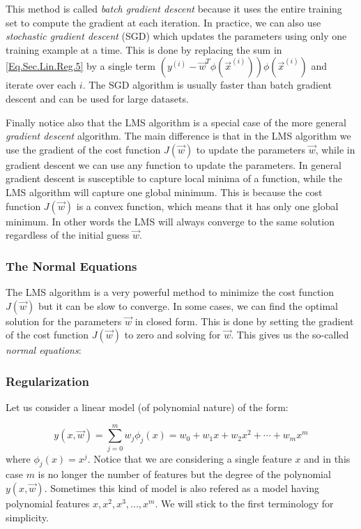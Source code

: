 \begin{remark}
	This method is called \emph{batch gradient descent} because it uses the entire training set to compute the gradient at each iteration. In practice, we can also use \emph{stochastic gradient descent} (SGD) which updates the parameters using only one training example at a time. This is done by replacing the sum in \cref{Eq.Sec.Lin.Reg.5} by a single term $(y^{(i)} - \vec{w}^T\phi(\vec{x}^{(i)}))\phi(\vec{x}^{(i)})$ and iterate over each $i$. The SGD algorithm is usually faster than batch gradient descent and can be used for large datasets. 
\end{remark}

Finally notice also that the LMS algorithm is a special case of the more general \emph{gradient descent} algorithm. The main difference is that in the LMS algorithm we use the gradient of the cost function $J(\vec{w})$ to update the parameters $\vec{w}$, while in gradient descent we can use any function to update the parameters. In general gradient descent is susceptible to capture local minima of a function, while the LMS algorithm will capture one global minimum. This is because the cost function $J(\vec{w})$ is a convex function, which means that it has only one global minimum. In other words the LMS will always converge to the same solution regardless of the initial guess $\vec{w}$. 

\subsubsection{The Normal Equations}
The LMS algorithm is a very powerful method to minimize the cost function $J(\vec{w})$ but it can be slow to converge. In some cases, we can find the optimal solution for the parameters $\vec{w}$ in closed form. This is done by setting the gradient of the cost function $J(\vec{w})$ to zero and solving for $\vec{w}$. This gives us the so-called \emph{normal equations}:


\subsubsection{Regularization}

Let us consider a linear model (of polynomial nature) of the form: 

\begin{equation}\label{Eq.Sec.Lin.Reg.7}
	y(x,\vec{w}) = \sum_{j=0}^{m}w_j\phi_j(x) = w_0 + w_1x + w_2x^2 + \cdots + w_m x^m 
\end{equation}
where $\phi_j(x)= x^j$. Notice that we are considering a single feature $x$ and in this case $m$ is no longer the number of features but the degree of the polynomial $y(x,\vec{w})$. Sometimes this kind of model is also refered as a model having polynomial features $x, x^2 ,x^3,...,x^m$. We will stick to the first terminology for simplicity. 

